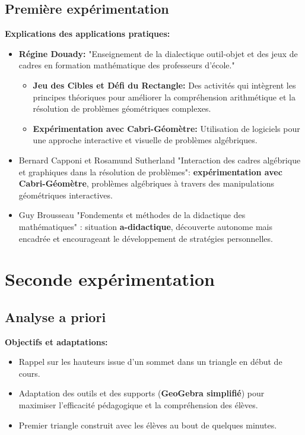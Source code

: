 \subsection{Première expérimentation}
\textbf{Explications des applications pratiques:}
\begin{itemize}
    \item \textbf{Régine Douady:} "Enseignement de la dialectique outil-objet et des jeux de cadres en formation mathématique des professeurs d'école."
    \begin{itemize}
        \item \textbf{Jeu des Cibles et Défi du Rectangle:} Des activités qui intègrent les principes théoriques pour améliorer la compréhension arithmétique et la résolution de problèmes géométriques complexes.
        \item \textbf{Expérimentation avec Cabri-Géomètre:} Utilisation de logiciels pour une approche interactive et visuelle de problèmes algébriques.
    \end{itemize}
    \item Bernard Capponi et Rosamund Sutherland "Interaction des cadres algébrique et graphiques dans la résolution de problèmes": \textbf{expérimentation avec Cabri-Géomètre}, problèmes algébriques à travers des manipulations géométriques interactives.
    \item Guy Brousseau "Fondements et méthodes de la didactique des mathématiques" : situation \textbf{a-didactique}, découverte autonome mais encadrée et encourageant le développement de stratégies personnelles.
\end{itemize}

\newpage
\section{Seconde expérimentation}
\subsection{Analyse a priori}
\textbf{Objectifs et adaptations:}
\begin{itemize}
    \item Rappel sur les hauteurs issue d'un sommet dans un triangle en début de cours.
    \item Adaptation des outils et des supports (\textbf{GeoGebra simplifié}) pour maximiser l'efficacité pédagogique et la compréhension des élèves.
    \item Premier triangle construit avec les élèves au bout de quelques minutes.
\end{itemize}
